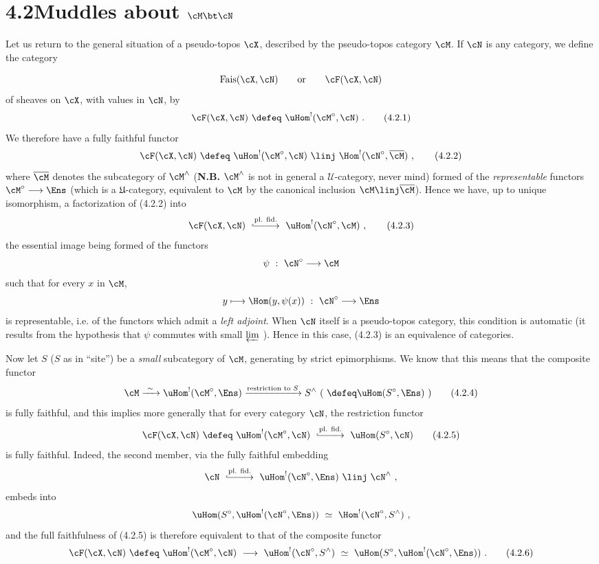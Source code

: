 \section*{4.2\quad Muddles about $\cM \bt \cN$}

Let us return to the general situation of a pseudo-topos $\cX$, described by the pseudo-topos category $\cM$. If $\cN$ is any category, we define the category

\[
\mathrm{Fais}(\cX,\cN) \qquad \text{or} \qquad \cF(\cX,\cN)
\]
of sheaves on $\cX$, with values in $\cN$, by
\[
\cF(\cX,\cN) \ \defeq\ \uHom^{!}(\cM^{\circ},\cN) \ .
\tag*{(4.2.1)}
\]
We therefore have a fully faithful functor
\[
\cF(\cX,\cN) \ \defeq\ \uHom^{!}(\cM^{\circ},\cN) \ \linj\ \Hom^{!}(\cN^{\circ},\overline{\cM}) \ ,
\tag*{(4.2.2)}
\]
where $\overline{\cM}$ denotes the subcategory of $\cM^{\wedge}$ (\textbf{N.B.} $\cM^{\wedge}$ is not in general a $\mathcal{U}$-category, never mind) formed of the \textit{representable} functors $\cM^{\circ}\longrightarrow\Ens$ (which is a $\mathfrak{U}$-category, equivalent to $\cM$ by the canonical inclusion $\cM \linj \overline{\cM}$). Hence we have, up to unique isomorphism, a factorization of (4.2.2) into
\[
\cF(\cX,\cN) \ \overset{\text{pl. fid.}}{\lhook\joinrel\relbar\joinrel\relbar\joinrel\longrightarrow}\ \uHom^{!}(\cN^{\circ},\cM) \ ,
\tag*{(4.2.3)}
\]
the essential image being formed of the functors
\[
\psi \ :\ \cN^{\circ} \longrightarrow \cM
\]
such that for every $x$ in $\cM$,
\[
y \longmapsto \Hom(y,\psi(x)) \ :\ \cN^{\circ} \longrightarrow \Ens
\]
is representable, i.e. of the functors which
admit a \textit{left adjoint}. When $\cN$ itself is a pseudo-topos category, this condition is automatic (it results from the hypothesis that $\psi$ commutes with small $\varprojlim$ ). Hence in this case, (4.2.3) is an equivalence of categories.

Now let $S$ ($S$ as in ``site'') be a \textit{small} subcategory of $\cM$, generating by strict epimorphisms. We know that this means that the composite functor
\[
\cM \xrightarrow{\ \sim\ } \uHom^{!}(\cM^{\circ},\Ens) \xrightarrow{\text{restriction to } S} S^{\wedge} \ (\ \defeq \uHom(S^{\circ},\Ens)\ )
\tag*{(4.2.4)}
\]
is fully faithful, and this implies more generally that for every category $\cN$, the restriction functor
\[
\cF(\cX,\cN) \ \defeq\ \uHom^{!}(\cM^{\circ},\cN) \ \overset{\text{pl. fid.}}{\lhook\joinrel\relbar\joinrel\relbar\joinrel\longrightarrow}\ \uHom(S^{\circ},\cN)
\tag*{(4.2.5)}
\]
is fully faithful. Indeed, the second member, via the fully faithful embedding
\[
\cN \ \overset{\text{pl. fid.}}{\lhook\joinrel\relbar\joinrel\relbar\joinrel\longrightarrow}\ \uHom^{!}(\cN^{\circ},\Ens) \ \linj\ \cN^{\wedge} \ ,
\]
embeds into
\[
\uHom(S^{\circ},\uHom^{!}(\cN^{\circ},\Ens)) \ \simeq\ \Hom^{!}(\cN^{\circ},S^{\wedge}) \ ,
\]
and the full faithfulness of (4.2.5) is therefore equivalent to that of the composite functor
\[
\cF(\cX,\cN) \ \defeq\ \uHom^{!}(\cM^{\circ},\cN) \ \longrightarrow\ \uHom^{!}(\cN^{\circ},S^{\wedge}) \ \simeq\ \uHom(S^{\circ},\uHom^{!}(\cN^{\circ},\Ens)) \ .
\tag*{(4.2.6)}
\]

